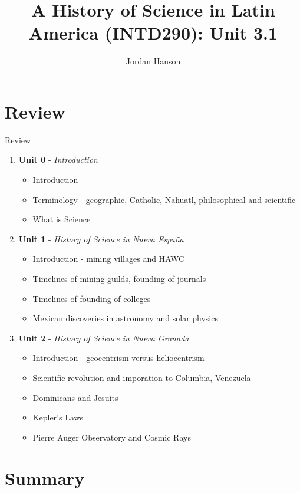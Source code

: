 \documentclass{beamer}
\title{A History of Science in Latin America (INTD290): Unit 3.1}
\author{Jordan Hanson}
\institute{Whittier College Department of Physics and Astronomy}
\begin{document}
\maketitle

\section{Review}

\begin{frame}{Review}
\begin{enumerate}
\item \textbf{Unit 0} - \textit{Introduction}
\begin{itemize}
\item Introduction
\item Terminology - geographic, Catholic, Nahuatl, philosophical and scientific
\item What is Science
\end{itemize}
\item \textbf{Unit 1} - \textit{History of Science in Nueva Espa\~{n}a}
\begin{itemize}
\item Introduction - mining villages and HAWC
\item Timelines of mining guilds, founding of journals
\item Timelines of founding of colleges
\item Mexican discoveries in astronomy and solar physics
\end{itemize}
\item \textbf{Unit 2} - \textit{History of Science in Nueva Granada}
\begin{itemize}
\item Introduction - geocentrism versus heliocentrism
\item Scientific revolution and imporation to Columbia, Venezuela
\item Dominicans and Jesuits
\item Kepler's Laws
\item Pierre Auger Observatory and Cosmic Rays
\end{itemize}
\end{enumerate}
\end{frame}

\section{Summary}
\end{document}

